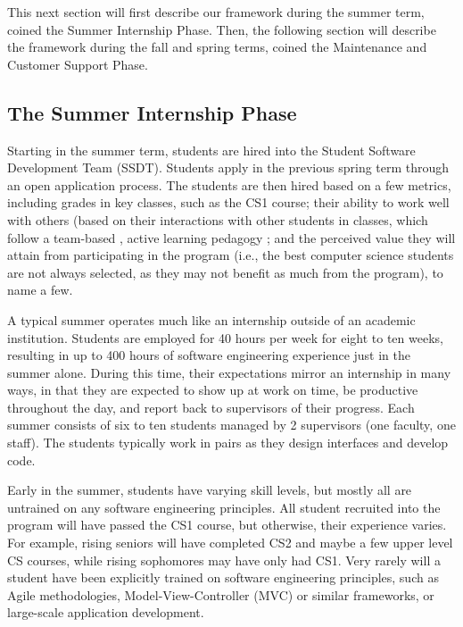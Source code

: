This next section will first describe our framework during the summer term, coined the Summer Internship Phase. Then, the following section will describe the framework during the fall and spring terms, coined the Maintenance and Customer Support Phase. 

\subsection{The Summer Internship Phase}
Starting in the summer term, students are hired into the Student Software Development Team (SSDT). Students apply in the previous spring term through an open application process. The students are then hired based on a few metrics, including grades in key classes, such as the CS1 course; their ability to work well with others (based on their interactions with other students in classes, which follow a team-based \cite{2002PairProgramming}, active learning pedagogy \cite{2012Pogil}; and the perceived value they will attain from participating in the program (i.e., the best computer science students are not always selected, as they may not benefit as much from the program), to name a few. 

A typical summer operates much like an internship outside of an academic institution. Students are employed for 40 hours per week for eight to ten weeks, resulting in up to 400 hours of software engineering experience just in the summer alone. During this time, their expectations mirror an internship in many ways, in that they are expected to show up at work on time, be productive throughout the day, and report back to supervisors of their progress. Each summer consists of six to ten students managed by 2 supervisors (one faculty, one staff). The students typically work in pairs as they design interfaces and develop code. 

Early in the summer, students have varying skill levels, but mostly all are untrained on any software engineering principles. All student recruited into the program will have passed the CS1 course, but otherwise, their experience varies. For example, rising seniors will have completed CS2 and maybe a few upper level CS courses, while rising sophomores may have only had CS1. Very rarely will a student have been explicitly trained on software engineering principles, such as Agile methodologies, Model-View-Controller (MVC) or similar frameworks, or large-scale application development.

